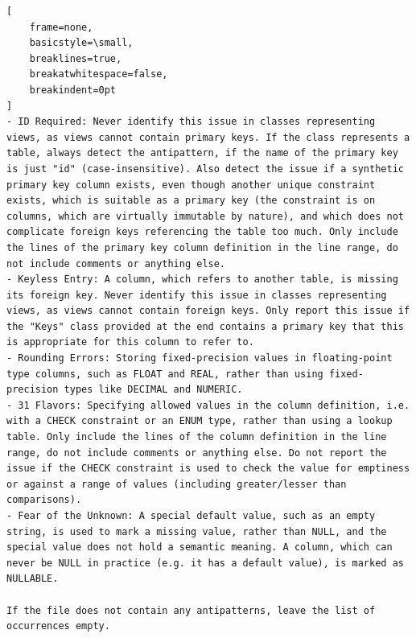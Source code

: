\bigskip %
\begingroup %
\captionsetup{type=figure}
{}\label{fig:ddlInstructions}
\begin{lstlisting}[
    frame=none,
    basicstyle=\small,
    breaklines=true,
    breakatwhitespace=false,
    breakindent=0pt
]
- ID Required: Never identify this issue in classes representing views, as views cannot contain primary keys. If the class represents a table, always detect the antipattern, if the name of the primary key is just "id" (case-insensitive). Also detect the issue if a synthetic primary key column exists, even though another unique constraint exists, which is suitable as a primary key (the constraint is on columns, which are virtually immutable by nature), and which does not complicate foreign keys referencing the table too much. Only include the lines of the primary key column definition in the line range, do not include comments or anything else.
- Keyless Entry: A column, which refers to another table, is missing its foreign key. Never identify this issue in classes representing views, as views cannot contain foreign keys. Only report this issue if the "Keys" class provided at the end contains a primary key that this is appropriate for this column to refer to.
- Rounding Errors: Storing fixed-precision values in floating-point type columns, such as FLOAT and REAL, rather than using fixed-precision types like DECIMAL and NUMERIC.
- 31 Flavors: Specifying allowed values in the column definition, i.e. with a CHECK constraint or an ENUM type, rather than using a lookup table. Only include the lines of the column definition in the line range, do not include comments or anything else. Do not report the issue if the CHECK constraint is used to check the value for emptiness or against a range of values (including greater/lesser than comparisons).
- Fear of the Unknown: A special default value, such as an empty string, is used to mark a missing value, rather than NULL, and the special value does not hold a semantic meaning. A column, which can never be NULL in practice (e.g. it has a default value), is marked as NULLABLE.

If the file does not contain any antipatterns, leave the list of occurrences empty.
\end{lstlisting}

\nopagebreak
\begin{minipage}{\linewidth}
\end{minipage}
\par %
\endgroup %

